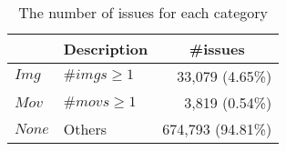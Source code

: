 
\begin{table}[h]
    \begin{center}
    \caption{The number of issues for each category}
    \begin{tabular}{llr}
        \toprule
         & \multicolumn{1}{c}{\textbf{Description}} & \multicolumn{1}{c}{\textbf{\#issues}} \\
        \midrule
        $Img$  & $\#imgs \geq 1$ & 33,079 (4.65\%)\\
        $Mov$  & $\#movs \geq 1$ & 3,819 (0.54\%)\\
        $None$ & Others & 674,793 (94.81\%)\\ 
        \bottomrule
    \end{tabular}
    \label{tab:issue-category}
    \end{center}
\end{table}
